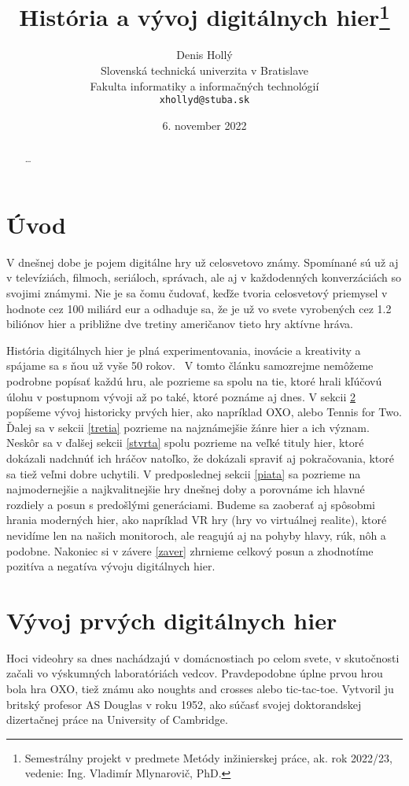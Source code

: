 \documentclass[10pt,oneside,slovak,a4paper]{article}
\title{História a vývoj digitálnych hier\thanks{Semestrálny projekt v predmete Metódy inžinierskej práce, ak. rok 2022/23, vedenie: Ing. Vladimír Mlynarovič, PhD.}} %
\author{Denis Hollý\\[2pt]
	{\small Slovenská technická univerzita v Bratislave}\\
	{\small Fakulta informatiky a informačných technológií}\\
	{\small \texttt{xhollyd@stuba.sk}}
	}
\date{\small 6. november 2022} %
\begin{document}
\maketitle

\begin{abstract}
\ldots
\end{abstract}



\section{Úvod}

V dnešnej dobe je pojem digitálne hry už celosvetovo známy. Spomínané sú už aj v televíziách, filmoch, seriáloch, správach, ale aj v každodenných konverzáciách so svojimi známymi. Nie je sa čomu čudovať, keďže tvoria celosvetový priemysel v hodnote cez 100 miliárd eur a odhaduje sa, že je už vo svete vyrobených cez 1.2 biliónov hier a približne dve tretiny američanov tieto hry aktívne hráva.

História digitálnych hier je plná experimentovania, inovácie a kreativity a spájame sa s ňou už vyše 50 rokov.~\cite{Sage:2006} V tomto článku samozrejme nemôžeme podrobne popísať každú hru, ale pozrieme sa spolu na tie, ktoré hrali kľúčovú úlohu v postupnom vývoji až po také, ktoré poznáme aj dnes. V sekcii \ref{druha} popíšeme vývoj historicky prvých hier, ako napríklad OXO, alebo Tennis for Two. Ďalej sa v sekcii \ref{tretia} pozrieme na najznámejšie žánre hier a ich význam. Neskôr sa v ďalšej sekcii \ref{stvrta} spolu pozrieme na veľké tituly hier, ktoré dokázali nadchnúť ich hráčov natoľko, že dokázali spraviť aj pokračovania, ktoré sa tiež veľmi dobre uchytili. V predposlednej sekcii \ref{piata} sa pozrieme na najmodernejšie a najkvalitnejšie hry dnešnej doby a porovnáme ich hlavné rozdiely a posun s predošlými generáciami. Budeme sa zaoberať aj spôsobmi hrania moderných hier, ako napríklad VR hry (hry vo virtuálnej realite), ktoré nevidíme len na našich monitoroch, ale reagujú aj na pohyby hlavy, rúk, nôh a podobne. Nakoniec si v závere \ref{zaver} zhrnieme celkový posun a zhodnotíme pozitíva a negatíva vývoju digitálnych hier.

\section{Vývoj prvých digitálnych hier} \label{druha}

Hoci videohry sa dnes nachádzajú v domácnostiach po celom svete, v skutočnosti začali vo výskumných laboratóriách vedcov. Pravdepodobne úplne prvou hrou bola hra OXO, tiež známu ako noughts and crosses alebo tic-tac-toe. Vytvoril ju britský profesor AS Douglas v roku 1952, ako súčasť svojej doktorandskej dizertačnej práce na University of Cambridge.
\end{document}
